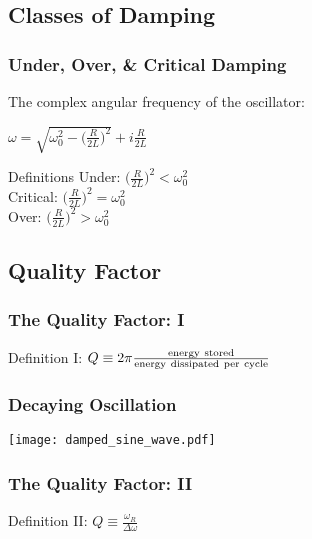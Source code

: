\documentclass[pdf,hideothersubsections]{beamer}
\begin{document}
\subsection{Classes of Damping}
\begin{frame}
\frametitle{Under, Over, \& Critical Damping}
The complex angular frequency of the oscillator:
\pause
\begin{center}
$\omega = \sqrt{\omega_0^2 - \Big(\frac{R}{2 L}\Big)^2} + i \frac{R}{2 L}$ \\
\end{center}
\pause
\begin{block}{Definitions}
Under: $\Big(\frac{R}{2 L}\Big)^2 < \omega_0^2$ \\
Critical: $\Big(\frac{R}{2 L}\Big)^2 = \omega_0^2$ \\
Over: $\Big(\frac{R}{2 L}\Big)^2 > \omega_0^2$
\end{block}


\end{frame}


\subsection{Quality Factor}
\begin{frame}
\frametitle{The Quality Factor: I}

\begin{block}{Definition I:}
$Q \equiv 2 \pi \frac{\rm energy~stored}{\rm energy~dissipated~per~cycle}$
\end{block}

\end{frame}

\begin{frame}
\frametitle{Decaying Oscillation}

\centering
\texttt{[image: damped\_sine\_wave.pdf]}

\end{frame}

\begin{frame}
\frametitle{The Quality Factor: II}

\begin{block}{Definition II:}
$Q \equiv \frac{\omega_R}{\Delta \omega}$
\end{block}


\end{frame}
\end{document}
